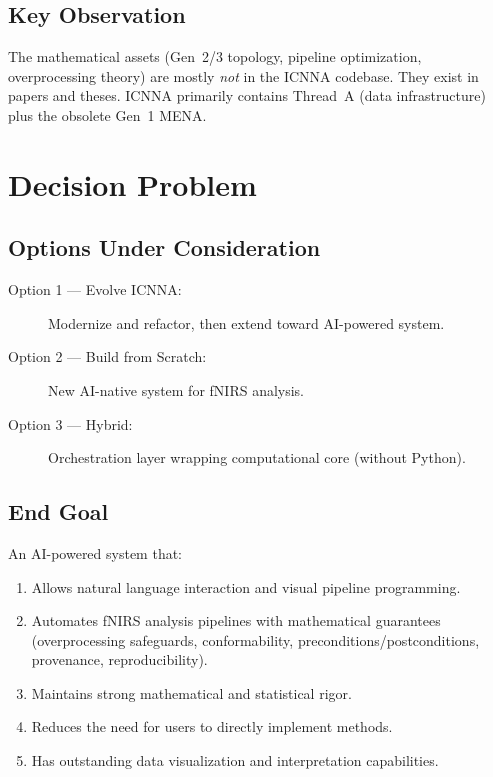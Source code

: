 \documentclass[11pt,a4paper]{article}
\begin{document}
\subsection{Key Observation}
The mathematical assets (Gen~2/3 topology, pipeline optimization, overprocessing theory) are mostly \emph{not} in the ICNNA codebase. They exist in papers and theses. ICNNA primarily contains Thread~A (data infrastructure) plus the obsolete Gen~1 MENA.

\section{Decision Problem}

\subsection{Options Under Consideration}
\begin{description}
    \item[Option 1 --- Evolve ICNNA:] Modernize and refactor, then extend toward AI-powered system.
    \item[Option 2 --- Build from Scratch:] New AI-native system for fNIRS analysis.
    \item[Option 3 --- Hybrid:] Orchestration layer wrapping computational core (without Python).
\end{description}

\subsection{End Goal}
An AI-powered system that:
\begin{enumerate}
    \item Allows natural language interaction and visual pipeline programming.
    \item Automates fNIRS analysis pipelines with mathematical guarantees (overprocessing safeguards, conformability, preconditions/postconditions, provenance, reproducibility).
    \item Maintains strong mathematical and statistical rigor.
    \item Reduces the need for users to directly implement methods.
    \item Has outstanding data visualization and interpretation capabilities.
\end{enumerate}

\end{document}
